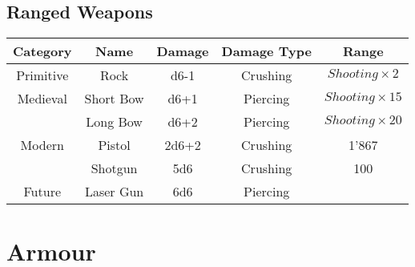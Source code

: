 \subsection{Ranged Weapons}
\begin{center}
\begin{tabular}{c | c | c | c | c}
    \textbf{Category} & \textbf{Name} & \textbf{Damage} & \textbf{Damage Type} & \textbf{Range} \\\hline
    Primitive & Rock        & d6-1  & Crushing & $Shooting \times 2$  \\\hline
    Medieval  & Short Bow   & d6+1  & Piercing & $Shooting \times 15$ \\
              & Long Bow    & d6+2  & Piercing & $Shooting \times 20$ \\\hline
    Modern    & Pistol      & 2d6+2 & Crushing & 1'867 \\
              & Shotgun     & 5d6   & Crushing & 100 \\\hline
    Future    & Laser Gun   & 6d6   & Piercing & 
\end{tabular}
\end{center}
\section{Armour}

